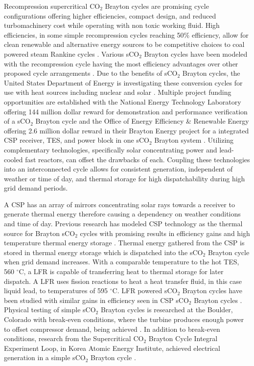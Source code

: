 Recompression supercritical CO$_2$ Brayton cycles are promising cycle configurations offering higher efficiencies, compact design, and reduced turbomachinery cost while operating with non toxic working fluid. High efficiencies, in some simple recompression cycles reaching 50\% efficiency, allow for clean renewable and alternative energy sources to be competitive choices to coal powered steam Rankine cycles \cite{turchi_2013,wright_2009}. Various sCO$_2$ Brayton cycles have been modeled with the recompression cycle having the most efficiency advantages over other proposed cycle arrangements \cite{wang_2018,turchi_2012}.  Due to the benefits of sCO$_2$ Brayton cycles, the United States Department of Energy is investigating these conversion cycles for use with heat sources including nuclear and solar \cite{doe_2012}. Multiple project funding opportunities are established with the National Energy Technology Laboratory offering 144 million dollar reward for demonstration and performance verification of a sCO$_2$ Brayton cycle \cite{netl_2016} and the Office of Energy Efficiency \& Renewable Energy offering 2.6 million dollar reward in their Brayton Energy project for a integrated CSP receiver, TES, and power block in one sCO$_2$ Brayton system \cite{seto_2015}. Utilizing complementary technologies, specifically solar concentrating power and lead-cooled fast reactors, can offset the drawbacks of each. Coupling these technologies into an interconnected cycle allows for consistent generation, independent of weather or time of day, and thermal storage for high dispatchability during high grid demand periods.

A CSP has an array of mirrors concentrating solar rays towards a receiver to generate thermal energy therefore causing a dependency on weather conditions and time of day. Previous research has modeled CSP technology as the thermal source for Brayton sCO$_2$ cycles with promising results in efficiency gains and high temperature thermal energy storage \cite{turchi_2012, turchi_2013, ho_2015, wang_2018}. Thermal energy gathered from the CSP is stored in thermal energy storage which is dispatched into the sCO$_2$ Brayton cycle when grid demand increases. With a comparable temperature to the hot TES, 560 $^{\circ}$C, a LFR is capable of transferring heat to thermal storage for later dispatch. A LFR uses fission reactions to heat a heat transfer fluid, in this case liquid lead, to temperatures of 595 $^{\circ}$C. LFR powered sCO$_2$ Brayton cycles have been studied with similar gains in efficiency seen in CSP sCO$_2$ Brayton cycles \cite{dostal_2005, dostal_2004, luo_2020}. Physical testing of simple sCO$_2$ Brayton cycles is researched at the Boulder, Colorado with break-even conditions, where the turbine produces enough power to offset compressor demand, being achieved \cite{wright_2011} . In addition to break-even conditions, research from the Supercritical CO$_2$ Brayton Cycle Integral Experiment Loop, in Korea Atomic Energy Institute, achieved electrical generation in a simple sCO$_2$ Brayton cycle \cite{cha_2016}. 

